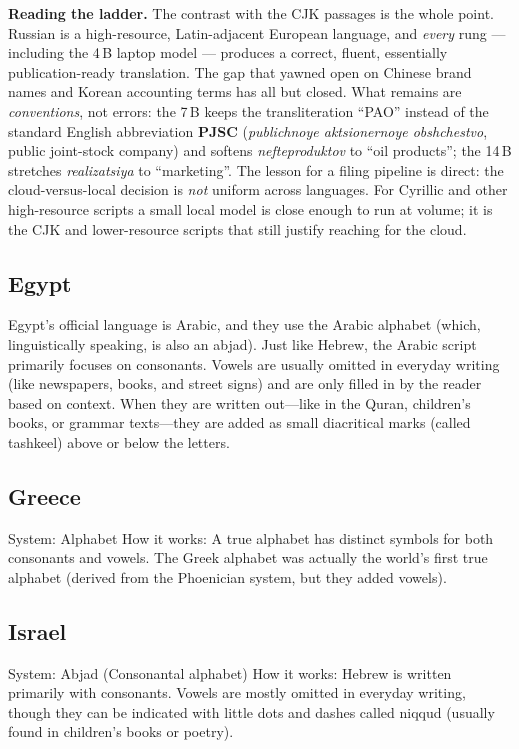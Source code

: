 \documentclass[11pt,a4paper]{report}
\begin{document}
\noindent \textbf{Reading the ladder.} The contrast with the CJK passages is the whole point. Russian is a
high-resource, Latin-adjacent European language, and \emph{every} rung --- including the 4\,B laptop model ---
produces a correct, fluent, essentially publication-ready translation. The gap that yawned open on Chinese
brand names and Korean accounting terms has all but closed. What remains are \emph{conventions}, not errors:
the 7\,B keeps the transliteration ``PAO'' instead of the standard English abbreviation \textbf{PJSC}
(\emph{publichnoye aktsionernoye obshchestvo}, public joint-stock company) and softens \emph{nefteproduktov}
to ``oil products''; the 14\,B stretches \emph{realizatsiya} to ``marketing''. The lesson for a filing
pipeline is direct: the cloud-versus-local decision is \emph{not} uniform across languages. For Cyrillic and
other high-resource scripts a small local model is close enough to run at volume; it is the CJK and
lower-resource scripts that still justify reaching for the cloud.

\subsection{Egypt}
Egypt's official language is Arabic, and they use the Arabic alphabet (which, linguistically speaking, is also an abjad).
Just like Hebrew, the Arabic script primarily focuses on consonants. Vowels are usually omitted in everyday writing (like newspapers, books, and street signs) and are only filled in by the reader based on context. When they are written out—like in the Quran, children's books, or grammar texts—they are added as small diacritical marks (called tashkeel) above or below the letters.

\subsection{Greece}
System: Alphabet
How it works: A true alphabet has distinct symbols for both consonants and vowels. The Greek alphabet was actually the world's first true alphabet (derived from the Phoenician system, but they added vowels).

\subsection{Israel}
System: Abjad (Consonantal alphabet)
How it works: Hebrew is written primarily with consonants. Vowels are mostly omitted in everyday writing, though they can be indicated with little dots and dashes called niqqud (usually found in children's books or poetry).
\end{document}
